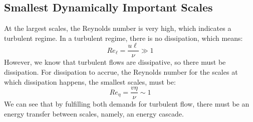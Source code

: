 \documentclass[11pt, a4paper]{article}
\begin{document}
\subsection{Smallest Dynamically Important Scales}
At the largest scales, the Reynolds number is very high, which indicates a turbulent regime. In a turbulent regime, there is no dissipation, which means:
\begin{equation}
 Re_\ell=\frac{u\ell}{\nu}\gg1
\end{equation}
However, we know that turbulent flows are dissipative, so there must be dissipation. For dissipation to accrue, the Reynolds number for the scales at which dissipation happens, the smallest scales, must be:
\begin{equation}
 Re_\eta=\frac{v\eta}{\nu}\sim1
\end{equation}
We can see that by fulfilling both demands for turbulent flow, there must be an energy transfer between scales, namely, an energy cascade.
\end{document}
